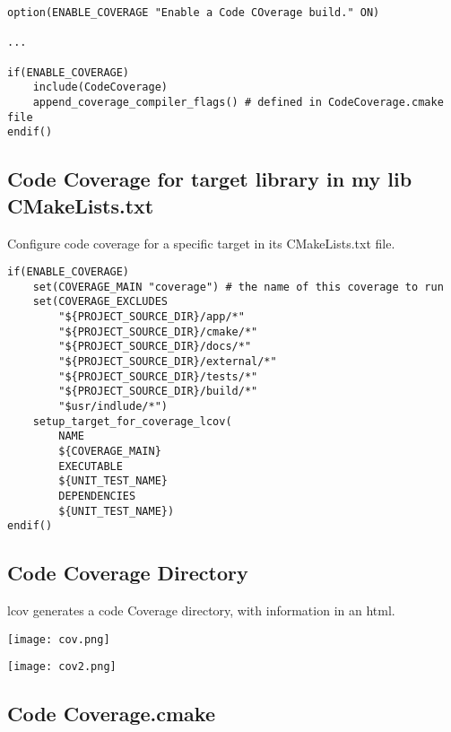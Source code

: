 \documentclass[openany]{report}
\begin{document}
\begin{verbatim}
option(ENABLE_COVERAGE "Enable a Code COverage build." ON)

...

if(ENABLE_COVERAGE)
    include(CodeCoverage)
    append_coverage_compiler_flags() # defined in CodeCoverage.cmake file
endif()

\end{verbatim}

\subsection{Code Coverage for target library in my lib CMakeLists.txt}

Configure code coverage for a specific target in its CMakeLists.txt file.

\begin{verbatim}
if(ENABLE_COVERAGE)
    set(COVERAGE_MAIN "coverage") # the name of this coverage to run
    set(COVERAGE_EXCLUDES
        "${PROJECT_SOURCE_DIR}/app/*"
        "${PROJECT_SOURCE_DIR}/cmake/*"
        "${PROJECT_SOURCE_DIR}/docs/*"
        "${PROJECT_SOURCE_DIR}/external/*"
        "${PROJECT_SOURCE_DIR}/tests/*"
        "${PROJECT_SOURCE_DIR}/build/*"
        "$usr/indlude/*")
    setup_target_for_coverage_lcov(
        NAME
        ${COVERAGE_MAIN}
        EXECUTABLE
        ${UNIT_TEST_NAME}
        DEPENDENCIES
        ${UNIT_TEST_NAME})
endif()
\end{verbatim}


\subsection{Code Coverage Directory}

lcov generates a code Coverage directory, with information in an html.


\begin{center}
    \texttt{[image: cov.png]}
\end{center}


\begin{center}
    \texttt{[image: cov2.png]}
\end{center}



\subsection{Code Coverage.cmake}
\end{document}
